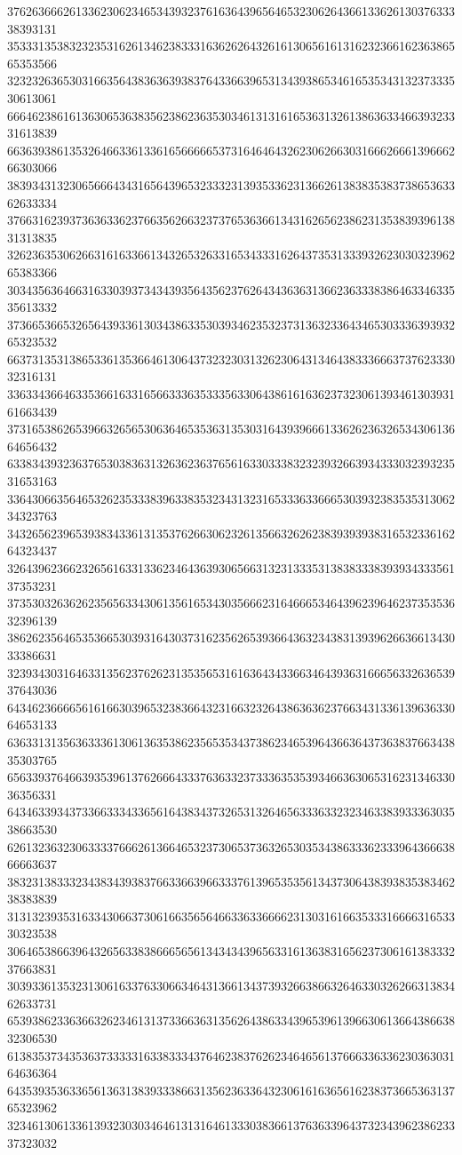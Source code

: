 37626366626133623062346534393237616364396564653230626436613362613037633338393131
35333135383232353162613462383331636262643261613065616131623236616236386565353566
32323263653031663564383636393837643366396531343938653461653534313237333530613061
66646238616136306536383562386236353034613131616536313261386363346639323331613839
66363938613532646633613361656666653731646464326230626630316662666139666266303066
38393431323065666434316564396532333231393533623136626138383538373865363362633334
37663162393736363362376635626632373765363661343162656238623135383939613831313835
32623635306266316163366134326532633165343331626437353133393262303032396265383366
30343563646631633039373434393564356237626434363631366236333838646334633535613332
37366536653265643933613034386335303934623532373136323364346530333639393265323532
66373135313865336135366461306437323230313262306431346438333666373762333032316131
33633436646335366163316566333635333563306438616163623732306139346130393161663439
37316538626539663265653063646535363135303164393966613362623632653430613664656432
63383439323637653038363132636236376561633033383232393266393433303239323531653163
33643066356465326235333839633835323431323165333633666530393238353531306234323763
34326562396539383433613135376266306232613566326262383939393831653233616264323437
32643962366232656163313362346436393065663132313335313838333839393433356137353231
37353032636262356563343061356165343035666231646665346439623964623735353632396139
38626235646535366530393164303731623562653936643632343831393962663661343033386631
32393430316463313562376262313535653161636434336634643936316665633263653937643036
64346236666561616630396532383664323166323264386363623766343133613963633064653133
63633131356363336130613635386235653534373862346539643663643736383766343835303765
65633937646639353961376266643337636332373336353539346636306531623134633036356331
64346339343733663334336561643834373265313264656333633232346338393336303538663530
62613236323063333766626136646532373065373632653035343863336233396436663866663637
38323138333234383439383766336639663337613965353561343730643839383538346238383839
31313239353163343066373061663565646633633666623130316166353331666631653330323538
30646538663964326563383866656561343434396563316136383165623730616138333237663831
30393361353231306163376330663464313661343739326638663264633032626631383462633731
65393862336366326234613137336636313562643863343965396139663061366438663832306530
61383537343536373333316338333437646238376262346465613766633633623036303164636364
64353935363365613631383933386631356236336432306161636561623837366536313765323962
32346130613361393230303464613131646133303836613763633964373234396238623337323032

